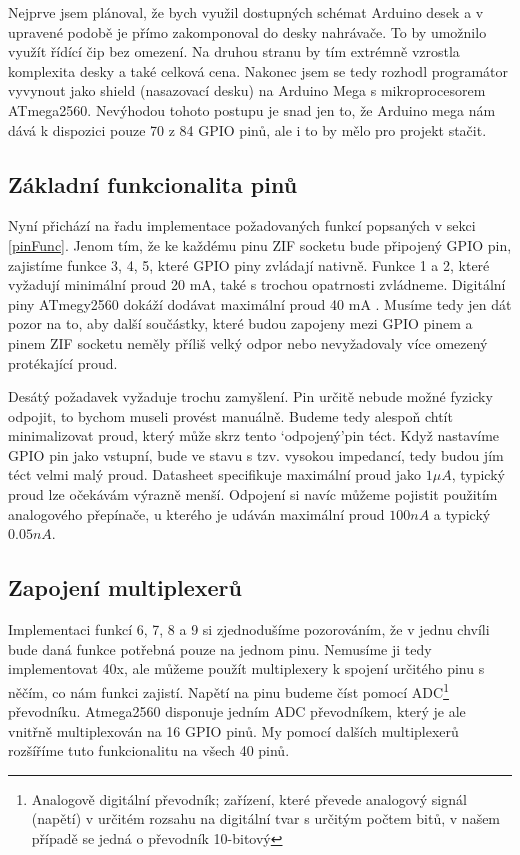\documentclass[11pt,a4paper,twoside,openright]{report}
\begin{document}
Nejprve jsem plánoval, že bych využil dostupných schémat Arduino desek a v upravené podobě je přímo zakomponoval do desky nahrávače. To by umožnilo využít řídící čip bez omezení. Na druhou stranu by tím extrémně vzrostla komplexita desky a také celková cena. Nakonec jsem se tedy rozhodl programátor vyvynout jako shield (nasazovací desku) na Arduino Mega s mikroprocesorem ATmega2560. Nevýhodou tohoto postupu je snad jen to, že Arduino mega nám dává k dispozici pouze 70 z 84 GPIO pinů, ale i to by mělo pro projekt stačit.\cite{ArduinoMega}

\subsection {Základní funkcionalita pinů}

Nyní přichází na řadu implementace požadovaných funkcí popsaných v sekci \ref{pinFunc}. Jenom tím, že ke každému pinu ZIF socketu bude připojený GPIO pin, zajistíme funkce 3, 4, 5, které GPIO piny zvládají nativně. Funkce 1 a 2, které vyžadují minimální proud 20 mA, také s trochou opatrnosti zvládneme. Digitální piny ATmegy2560 dokáží dodávat maximální proud 40 mA \cite[str.~355]{atmega2560}. Musíme tedy jen dát pozor na to, aby další součástky, které budou zapojeny mezi GPIO pinem a pinem ZIF socketu neměly příliš velký odpor nebo nevyžadovaly více omezený protékající proud.

Desátý požadavek vyžaduje trochu zamyšlení. Pin určitě nebude možné fyzicky odpojit, to bychom museli provést manuálně. Budeme tedy alespoň chtít minimalizovat proud, který může skrz tento \lq odpojený\rq   pin téct. Když nastavíme GPIO pin jako vstupní, bude ve stavu s tzv. vysokou impedancí, tedy budou jím téct velmi malý proud. Datasheet specifikuje maximální proud jako $1 \mu  A$, typický proud lze očekávám výrazně menší. Odpojení si navíc můžeme pojistit použitím analogového přepínače, u kterého je udáván maximální proud $100nA$ a typický $0.05nA$.\cite[str.~3]{switch1}

\subsection {Zapojení multiplexerů}

Implementaci funkcí 6, 7, 8 a 9 si zjednodušíme pozorováním, že v jednu chvíli bude daná funkce potřebná pouze na jednom pinu. Nemusíme ji tedy implementovat 40x, ale můžeme použít multiplexery k spojení určitého pinu s něčím, co nám funkci zajistí. Napětí na pinu budeme číst pomocí ADC\footnote{Analogově digitální převodník; zařízení, které převede analogový signál (napětí) v určitém rozsahu na digitální tvar s určitým počtem bitů, v našem případě se jedná o převodník 10-bitový} převodníku. Atmega2560 disponuje jedním ADC převodníkem, který je ale vnitřně multiplexován na 16 GPIO pinů. My pomocí dalších multiplexerů rozšíříme tuto funkcionalitu na všech 40 pinů.
\end{document}

